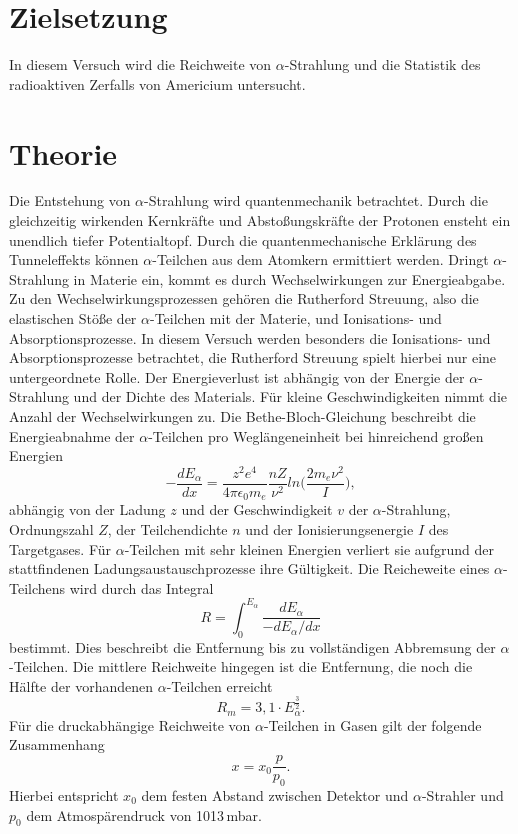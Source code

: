 
\section{Zielsetzung}
In diesem Versuch wird die Reichweite von $\alpha$-Strahlung und die Statistik des radioaktiven Zerfalls von
Americium untersucht.
\section{Theorie}
Die Entstehung von $\alpha$-Strahlung wird quantenmechanik betrachtet. Durch die gleichzeitig wirkenden Kernkräfte und
Abstoßungskräfte der Protonen ensteht ein unendlich tiefer Potentialtopf. Durch die quantenmechanische Erklärung des
Tunneleffekts können $\alpha$-Teilchen aus dem Atomkern ermittiert werden.
\newline
Dringt $\alpha$-Strahlung in Materie ein, kommt es durch Wechselwirkungen zur Energieabgabe. Zu den Wechselwirkungsprozessen
gehören die Rutherford Streuung, also die elastischen Stöße der $\alpha$-Teilchen mit der Materie, und Ionisations- und Absorptionsprozesse.
In diesem Versuch werden besonders die Ionisations- und Absorptionsprozesse betrachtet, die Rutherford Streuung spielt hierbei nur eine
untergeordnete Rolle.
\newline
Der Energieverlust ist abhängig von der Energie der $\alpha$-Strahlung und der Dichte des Materials.
Für kleine Geschwindigkeiten nimmt die Anzahl der Wechselwirkungen zu.
Die Bethe-Bloch-Gleichung beschreibt die Energieabnahme der $\alpha$-Teilchen pro Weglängeneinheit bei hinreichend großen Energien
\begin{equation}
 -\frac{dE_{\alpha}}{dx} = \frac{z^2e^4}{4\pi\epsilon_0 m_e}\frac{nZ}{\nu^2}ln\bigg(\frac{2m_e \nu^2}{I}\bigg),
\end{equation}
abhängig von der Ladung $z$ und der Geschwindigkeit $v$ der $\alpha$-Strahlung,
Ordnungszahl $Z$, der Teilchendichte $n$ und der Ionisierungsenergie $I$ des Targetgases.
Für $\alpha$-Teilchen mit sehr kleinen Energien verliert sie aufgrund der stattfindenen Ladungsaustauschprozesse
ihre Gültigkeit.
\newline
Die Reicheweite eines $\alpha$-Teilchens wird durch das Integral
\begin{equation}
 R = \int_{0}^{E_{\alpha}} \frac{dE_{\alpha}}{-dE_{\alpha}/dx}
\end{equation}
bestimmt. Dies beschreibt die Entfernung bis zu vollständigen Abbremsung der $\alpha$-Teilchen.
Die mittlere Reichweite hingegen ist die Entfernung, die noch die Hälfte der vorhandenen $\alpha$-Teilchen erreicht
\begin{equation}
  R_m = 3,1 \cdot E_{\alpha}^{\frac{3}{2}}.
  \label{eqn:Rm}
\end{equation}
Für die druckabhängige Reichweite von $\alpha$-Teilchen in Gasen gilt der folgende Zusammenhang
\begin{equation}
  x = x_0 \frac{p}{p_0}.
  \label{eqn:eff}
\end{equation}
Hierbei entspricht $x_0$ dem festen Abstand zwischen Detektor und $\alpha$-Strahler und $p_0$ dem Atmospärendruck
von 1013\,mbar.

